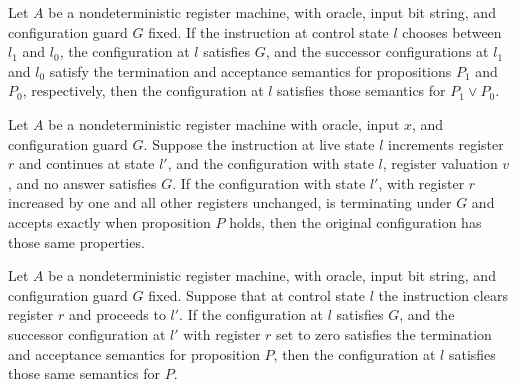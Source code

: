 \begin{lemma}
\label{Complexity.LogProg.NSem.choose}
\leanok
{}
Let $A$ be a nondeterministic register machine, with oracle, input bit string, and
configuration guard $G$ fixed. If the instruction at control state $l$ chooses between
$l_1$ and $l_0$, the configuration at $l$ satisfies $G$, and the successor
configurations at $l_1$ and $l_0$ satisfy the termination and acceptance semantics for
propositions $P_1$ and $P_0$, respectively, then the configuration at $l$ satisfies
those semantics for $P_1 \lor P_0$.
\end{lemma}

\begin{lemma}
\label{Complexity.LogProg.NSem.inc}
\leanok
{}
Let $A$ be a nondeterministic register machine with oracle, input $x$, and configuration
guard $G$. Suppose the instruction at live state $l$ increments register $r$ and
continues at state $l'$, and the configuration with state $l$, register valuation $v$,
and no answer satisfies $G$. If the configuration with state $l'$, with register $r$
increased by one and all other registers unchanged, is terminating under $G$ and accepts
exactly when proposition $P$ holds, then the original configuration has those same
properties.
\end{lemma}

\begin{lemma}
\label{Complexity.LogProg.NSem.clr}
\leanok
{}
Let $A$ be a nondeterministic register machine, with oracle, input bit string, and
configuration guard $G$ fixed. Suppose that at control state $l$ the instruction clears
register $r$ and proceeds to $l'$. If the configuration at $l$ satisfies $G$, and the
successor configuration at $l'$ with register $r$ set to zero satisfies the termination
and acceptance semantics for proposition $P$, then the configuration at $l$ satisfies
those same semantics for $P$.
\end{lemma}

